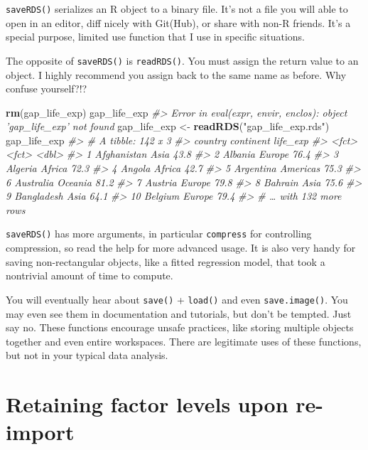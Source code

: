 \documentclass[
]{book}
\newenvironment{Shaded}{\begin{snugshade}}{\end{snugshade}}
\newcommand{\CommentTok}[1]{\textcolor[rgb]{0.56,0.35,0.01}{\textit{#1}}}
\newcommand{\KeywordTok}[1]{\textcolor[rgb]{0.13,0.29,0.53}{\textbf{#1}}}
\newcommand{\NormalTok}[1]{#1}
\newcommand{\StringTok}[1]{\textcolor[rgb]{0.31,0.60,0.02}{#1}}
\begin{document}
\texttt{saveRDS()} serializes an R object to a binary file. It's not a file you will able to open in an editor, diff nicely with Git(Hub), or share with non-R friends. It's a special purpose, limited use function that I use in specific situations.

The opposite of \texttt{saveRDS()} is \texttt{readRDS()}. You must assign the return value to an object. I highly recommend you assign back to the same name as before. Why confuse yourself?!?

\begin{Shaded}
\begin{Highlighting}[]
\KeywordTok{rm}\NormalTok{(gap_life_exp)}
\NormalTok{gap_life_exp}
\CommentTok{#> Error in eval(expr, envir, enclos): object 'gap_life_exp' not found}
\NormalTok{gap_life_exp <-}\StringTok{ }\KeywordTok{readRDS}\NormalTok{(}\StringTok{"gap_life_exp.rds"}\NormalTok{)}
\NormalTok{gap_life_exp}
\CommentTok{#> # A tibble: 142 x 3}
\CommentTok{#>    country     continent life_exp}
\CommentTok{#>    <fct>       <fct>        <dbl>}
\CommentTok{#>  1 Afghanistan Asia          43.8}
\CommentTok{#>  2 Albania     Europe        76.4}
\CommentTok{#>  3 Algeria     Africa        72.3}
\CommentTok{#>  4 Angola      Africa        42.7}
\CommentTok{#>  5 Argentina   Americas      75.3}
\CommentTok{#>  6 Australia   Oceania       81.2}
\CommentTok{#>  7 Austria     Europe        79.8}
\CommentTok{#>  8 Bahrain     Asia          75.6}
\CommentTok{#>  9 Bangladesh  Asia          64.1}
\CommentTok{#> 10 Belgium     Europe        79.4}
\CommentTok{#> # … with 132 more rows}
\end{Highlighting}
\end{Shaded}

\texttt{saveRDS()} has more arguments, in particular \texttt{compress} for controlling compression, so read the help for more advanced usage. It is also very handy for saving non-rectangular objects, like a fitted regression model, that took a nontrivial amount of time to compute.

You will eventually hear about \texttt{save()} + \texttt{load()} and even \texttt{save.image()}. You may even see them in documentation and tutorials, but don't be tempted. Just say no. These functions encourage unsafe practices, like storing multiple objects together and even entire workspaces. There are legitimate uses of these functions, but not in your typical data analysis.

\hypertarget{retaining-factor-levels-upon-re-import}{%
\section{Retaining factor levels upon re-import}\label{retaining-factor-levels-upon-re-import}}
\end{document}
